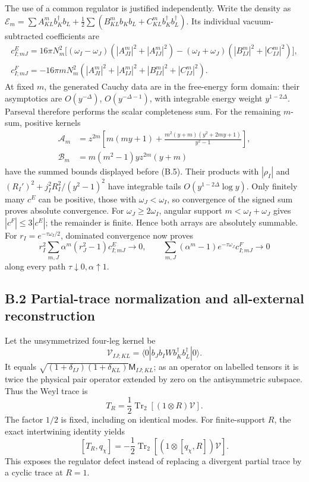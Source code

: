 The use of a common regulator is justified independently. Write the density as \(\mathcal E_m=\sum A^m_{KL}b_K^\dagger b_L+ \frac12\sum(B^m_{KL}b_Kb_L+C^m_{KL}b_K^\dagger b_L^\dagger)\). Its individual vacuum-subtracted coefficients are \[
\begin{aligned}
c^E_{I;mJ}=16\pi N_m^2\bigl[
(\omega_I-\omega_J)(|A^m_{JI}|^2+|A^m_{IJ}|^2)
-(\omega_I+\omega_J)(|B^m_{IJ}|^2+|C^m_{IJ}|^2)\bigr],\\
c^F_{I;mJ}=-16\pi mN_m^2
(|A^m_{JI}|^2+|A^m_{IJ}|^2+|B^m_{IJ}|^2+|C^m_{IJ}|^2).
\end{aligned}
\tag{B.7}
\] At fixed \(m\), the generated Cauchy data are in the free-energy form domain: their asymptotics are \(O(y^{-\Delta})\), \(O(y^{-\Delta-1})\), with integrable energy weight \(y^{1-2\Delta}\). Parseval therefore performs the scalar completeness sum. For the remaining \(m\)-sum, positive kernels \[
\begin{aligned}
\mathscr A_m&=z^{2m}\left[
m(my+1)+\frac{m^2(y+m)(y^2+2my+1)}{y^2-1}\right],\\
\mathscr B_m&=m(m^2-1)yz^{2m}(y+m)
\end{aligned}
\] have the summed bounds displayed before (B.5). Their products with \(|\rho_I|\) and \((R_I')^2+j_I^2R_I^2/(y^2-1)^2\) have integrable tails \(O(y^{1-2\Delta}\log y)\). Only finitely many \(c^E\) can be positive, those with \(\omega_J<\omega_I\), so convergence of the signed sum proves absolute convergence. For \(\omega_J\ge2\omega_I\), angular support \(m<\omega_I+\omega_J\) gives \(|c^F|\le3|c^E|\); the remainder is finite. Hence both arrays are absolutely summable. For \(r_I=e^{-\tau\omega_I/2}\), dominated convergence now proves \[
r_I^2\sum_{m,J}\alpha^m(r_J^2-1)c^E_{I;mJ}\longrightarrow0,
\qquad
\sum_{m,J}(\alpha^m-1)e^{-\tau\omega_J}c^F_{I;mJ}
\longrightarrow0
\tag{B.8}
\] along every path \(\tau\downarrow0,\alpha\uparrow1\).

\hypertarget{b.2-partial-trace-normalization-and-all-external-reconstruction}{%
\subsection{B.2 Partial-trace normalization and all-external reconstruction}\label{b.2-partial-trace-normalization-and-all-external-reconstruction}}

Let the unsymmetrized four-leg kernel be \[
\mathcal V_{IJ;KL}=\langle0|b_Jb_IWb_K^\dagger b_L^\dagger|0\rangle .
\] It equals \(\sqrt{(1+\delta_{IJ})(1+\delta_{KL})}\mathsf M_{IJ;KL}\); as an operator on labelled tensors it is twice the physical pair operator extended by zero on the antisymmetric subspace. Thus the Weyl trace is \[
T_R=\frac12\operatorname{Tr}_2[(1\otimes R)\mathcal V].
\tag{B.9}
\] The factor \(1/2\) is fixed, including on identical modes. For finite-support \(R\), the exact intertwining identity yields \[
[T_R,q_\chi]=-\frac12\operatorname{Tr}_2
[(1\otimes[q_\chi,R])\mathcal V].
\tag{B.10}
\] This exposes the regulator defect instead of replacing a divergent partial trace by a cyclic trace at \(R=1\).

